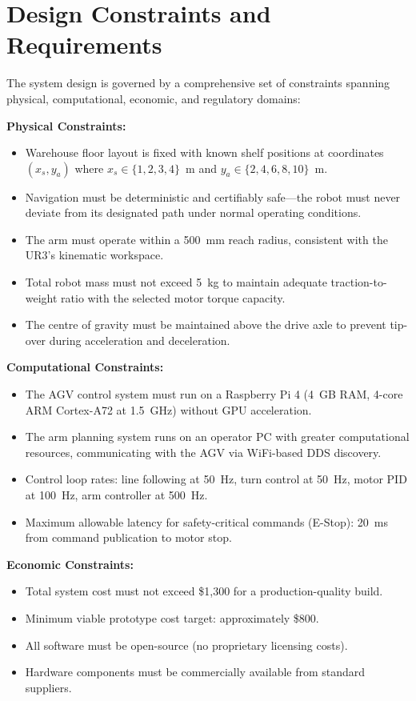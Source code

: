 \documentclass[12pt,a4paper,oneside]{report}
\begin{document}
\section{Design Constraints and Requirements}

The system design is governed by a comprehensive set of constraints spanning physical, computational, economic, and regulatory domains:

\textbf{Physical Constraints:}
\begin{itemize}
\item Warehouse floor layout is fixed with known shelf positions at coordinates $(x_s, y_a)$ where $x_s \in \{1, 2, 3, 4\}$~m and $y_a \in \{2, 4, 6, 8, 10\}$~m.
\item Navigation must be deterministic and certifiably safe---the robot must never deviate from its designated path under normal operating conditions.
\item The arm must operate within a 500~mm reach radius, consistent with the UR3's kinematic workspace.
\item Total robot mass must not exceed 5~kg to maintain adequate traction-to-weight ratio with the selected motor torque capacity.
\item The centre of gravity must be maintained above the drive axle to prevent tip-over during acceleration and deceleration.
\end{itemize}

\textbf{Computational Constraints:}
\begin{itemize}
\item The AGV control system must run on a Raspberry Pi 4 (4~GB RAM, 4-core ARM Cortex-A72 at 1.5~GHz) without GPU acceleration.
\item The arm planning system runs on an operator PC with greater computational resources, communicating with the AGV via WiFi-based DDS discovery.
\item Control loop rates: line following at 50~Hz, turn control at 50~Hz, motor PID at 100~Hz, arm controller at 500~Hz.
\item Maximum allowable latency for safety-critical commands (E-Stop): 20~ms from command publication to motor stop.
\end{itemize}

\textbf{Economic Constraints:}
\begin{itemize}
\item Total system cost must not exceed \$1,300 for a production-quality build.
\item Minimum viable prototype cost target: approximately \$800.
\item All software must be open-source (no proprietary licensing costs).
\item Hardware components must be commercially available from standard suppliers.
\end{itemize}
\end{document}
